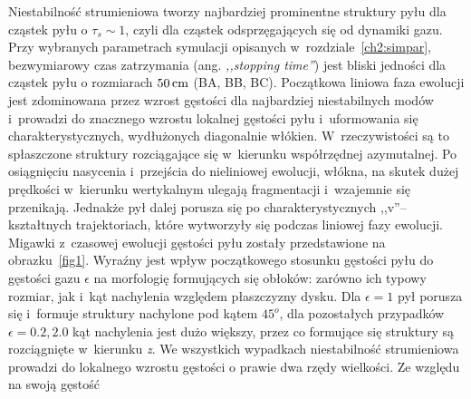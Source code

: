 Niestabilność strumieniowa tworzy najbardziej prominentne struktury pyłu dla
cząstek pyłu o $\tau_s \sim 1$, czyli dla cząstek odsprzęgających się od
dynamiki gazu.
Przy wybranych parametrach symulacji opisanych w~rozdziale~\ref{ch2:simpar},
bezwymiarowy czas zatrzymania (ang. \emph{,,stopping time''}) jest bliski
jedności dla cząstek pyłu o rozmiarach $50\hbox{$\thinspace\textrm{cm}$}$ (BA, BB, BC). Początkowa liniowa
faza ewolucji jest zdominowana przez wzrost gęstości dla najbardziej
niestabilnych modów i~prowadzi do znacznego wzrostu lokalnej gęstości pyłu
i~uformowania się charakterystycznych, wydłużonych diagonalnie włókien.
W~rzeczywistości są to spłaszczone struktury rozciągające się w~kierunku
współrzędnej azymutalnej. Po osiągnięciu nasycenia i~przejścia do nieliniowej
ewolucji, włókna, na skutek dużej prędkości w~kierunku wertykalnym ulegają
fragmentacji i~wzajemnie się przenikają. Jednakże pył dalej porusza się po
charakterystycznych ,,v''--kształtnych trajektoriach, które wytworzyły się
podczas liniowej fazy ewolucji. Migawki z~czasowej ewolucji gęstości pyłu
zostały przedstawione na obrazku~\ref{fig1}. Wyraźny jest wpływ początkowego
stosunku gęstości pyłu do gęstości gazu $\epsilon$ na morfologię formujących się
obłoków: zarówno ich typowy rozmiar, jak i~kąt nachylenia względem płaszczyzny
dysku. Dla $\epsilon = 1$ pył porusza się i~formuje struktury nachylone pod
kątem $45^o$, dla pozostałych przypadków $\epsilon=0.2, 2.0$ kąt nachylenia jest
dużo większy, przez co formujące się struktury są rozciągnięte w~kierunku
\emph{z}. We wszystkich wypadkach niestabilność strumieniowa prowadzi do
lokalnego wzrostu gęstości o prawie dwa rzędy wielkości.  Ze względu na swoją
gęstość

